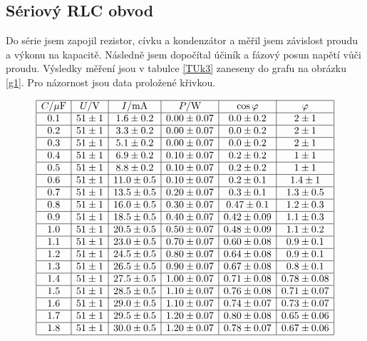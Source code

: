\documentclass[a4paper,12pt]{article}
\begin{document}
\subsection{Sériový RLC obvod}
Do série jsem zapojil rezistor, cívku a kondenzátor a měřil jsem závislost proudu a výkonu na kapacitě. Následně jsem dopočítal účiník a fázový posun napětí vůči proudu. 
Výsledky měření jsou v tabulce \ref{TUk3} zaneseny do grafu na obrázku \ref{g1}. Pro názornost jsou data proložené křivkou.
\begin{table}
$$
\begin{array}{|c|c|c|c|c|c|}
\hline
C/\mu\mbox{F}&  U/\mbox{V}& I/\mbox{mA}&    P/\mbox{W}& \cos\varphi&    \varphi\\ \hline
0.1&51\pm 1&1.6\pm 0.2&0.00\pm 0.07&0.0\pm 0.2&2\pm1\\ \hline
0.2&51\pm 1&3.3\pm 0.2&0.00\pm 0.07&0.0\pm 0.2&2\pm1\\ \hline
0.3&51\pm 1&5.1\pm 0.2&0.00\pm 0.07&0.0\pm 0.2&2\pm1\\ \hline
0.4&51\pm 1&6.9\pm 0.2&0.10\pm 0.07&0.2\pm 0.2&1\pm1\\ \hline
0.5&51\pm 1&8.8\pm 0.2&0.10\pm 0.07&0.2\pm 0.2&1\pm1\\ \hline
0.6&51\pm 1&11.0\pm 0.5&0.10\pm 0.07&0.2\pm 0.1&1.4\pm1\\ \hline
0.7&51\pm 1&13.5\pm 0.5&0.20\pm 0.07&0.3\pm 0.1&1.3\pm0.5\\ \hline
0.8&51\pm 1&16.0\pm 0.5&0.30\pm 0.07&0.47\pm 0.1&1.2\pm0.3\\ \hline
0.9&51\pm 1&18.5\pm 0.5&0.40\pm 0.07&0.42\pm 0.09&1.1\pm0.3\\ \hline
1.0&51\pm 1&20.5\pm 0.5&0.50\pm 0.07&0.48\pm 0.09&1.1\pm0.2\\ \hline
1.1&51\pm 1&23.0\pm 0.5&0.70\pm 0.07&0.60\pm 0.08&0.9\pm0.1\\ \hline
1.2&51\pm 1&24.5\pm 0.5&0.80\pm 0.07&0.64\pm 0.08&0.9\pm0.1\\ \hline
1.3&51\pm 1&26.5\pm 0.5&0.90\pm 0.07&0.67\pm 0.08&0.8\pm0.1\\ \hline
1.4&51\pm 1&27.5\pm 0.5&1.00\pm 0.07&0.71\pm 0.08&0.78\pm0.08\\ \hline
1.5&51\pm 1&28.5\pm 0.5&1.10\pm 0.07&0.76\pm 0.08&0.71\pm0.07\\ \hline
1.6&51\pm 1&29.0\pm 0.5&1.10\pm 0.07&0.74\pm 0.07&0.73\pm0.07\\ \hline
1.7&51\pm 1&29.5\pm 0.5&1.20\pm 0.07&0.80\pm 0.08&0.65\pm0.06\\ \hline
1.8&51\pm 1&30.0\pm 0.5&1.20\pm 0.07&0.78\pm 0.07&0.67\pm0.06\\ \hline

\end{array}$$
\end{table}
\end{document}
